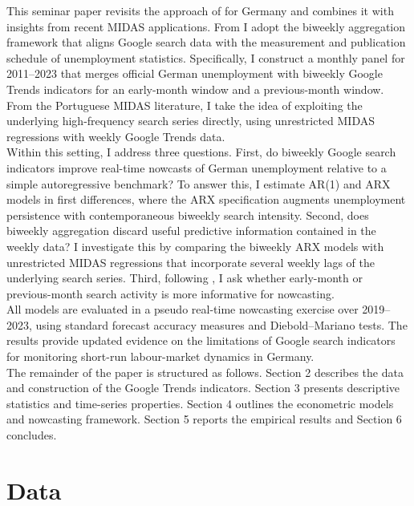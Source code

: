\documentclass[12pt,a4paper]{article}
\begin{document}
This seminar paper revisits the approach of \citet{Askitas} for Germany and combines it with insights from recent MIDAS applications. From \citet{Askitas} I adopt the biweekly aggregation framework that aligns Google search data with the measurement and publication schedule of unemployment statistics. Specifically, I construct a monthly panel for 2011–2023 that merges official German unemployment with biweekly Google Trends indicators for an early-month window and a previous-month window. From the Portuguese MIDAS literature, I take the idea of exploiting the underlying high-frequency search series directly, using unrestricted MIDAS regressions with weekly Google Trends data.\\
Within this setting, I address three questions. First, do biweekly Google search indicators improve real-time nowcasts of German unemployment relative to a simple autoregressive benchmark? To answer this, I estimate AR(1) and ARX models in first differences, where the ARX specification augments unemployment persistence with contemporaneous biweekly search intensity. Second, does biweekly aggregation discard useful predictive information contained in the weekly data? I investigate this by comparing the biweekly ARX models with unrestricted MIDAS regressions that incorporate several weekly lags of the underlying search series. Third, following \citet{Askitas}, I ask whether early-month  or previous-month search activity is more informative for nowcasting.\\
All models are evaluated in a pseudo real-time nowcasting exercise over 2019–2023, using standard forecast accuracy measures and Diebold–Mariano tests. The results provide updated evidence on the limitations of Google search indicators for monitoring short-run labour-market dynamics in Germany.\\
The remainder of the paper is structured as follows. Section 2 describes the data and construction of the Google Trends indicators. Section 3 presents descriptive statistics and time-series properties. Section 4 outlines the econometric models and nowcasting framework. Section 5 reports the empirical results and Section 6 concludes.





\section{Data}
\end{document}
